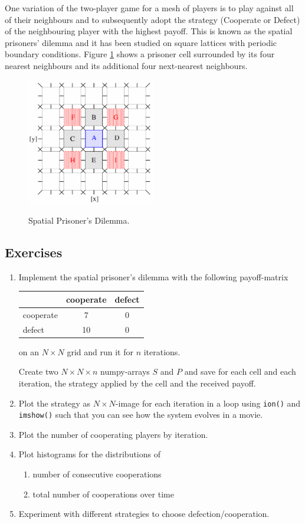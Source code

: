 \documentclass[smallheadings,12pt]{scrartcl}
\begin{document}
One variation of the two-player game for a mesh of players is to play
against all of their neighbours and to subsequently adopt the strategy
(Cooperate or Defect) of the neighbouring player with the highest
payoff.  This is known as the spatial prisoners' dilemma and it has
been studied on square lattices with periodic boundary
conditions. Figure \ref{prison} shows a prisoner cell surrounded by
its four nearest neighbours and its additional four next-nearest
neighbours.

\begin{figure}[H]
  \centering
  \includegraphics[width=0.5\textwidth]{pics/spatialprison}
  \label{prison}
  \caption{Spatial Prisoner's Dilemma.}
\end{figure}

\subsection*{Exercises}

\begin{enumerate}
\item Implement the spatial prisoner's dilemma with the following
  payoff-matrix

  \begin{tabular}{l|cc}
    & cooperate & defect\\\hline
    cooperate & 7  & 0  \\
  defect    & 10 & 0  \\
  \end{tabular}

  on an $N\times N$ grid and run it for $n$ iterations.
  
  Create two $N\times N\times n$ numpy-arrays $S$ and $P$ and save for
  each cell and each iteration, the strategy applied by the cell and
  the received payoff.
\item Plot the strategy as $N\times N$-image for each iteration in a
  loop using {\tt ion()} and {\tt imshow()} such that you can see how
  the system evolves in a movie.
\item Plot the number of cooperating players by iteration.
\item Plot histograms for the distributions of
  \begin{enumerate}
  \item number of consecutive cooperations
  \item total number of cooperations over time
  \end{enumerate}
\item Experiment with different strategies to choose
  defection/cooperation. 
\end{enumerate}
\end{document}
